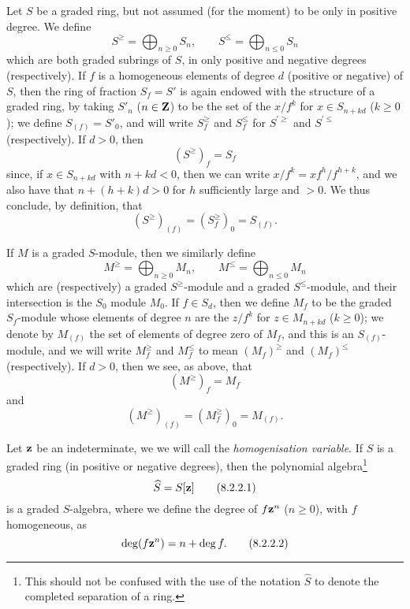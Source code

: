 \begin{env}[8.2.1]
\label{2.8.2.1}
Let $S$ be a graded ring, but not assumed (for the moment) to be only in positive degree.
We define
\[
\label{eq:2.8.2.1.1}
  S^\geq = \bigoplus_{n\geq0} S_n,
  \qquad
  S^\leq = \bigoplus_{n\leq0} S_n
\tag{8.2.1.1}
\]
which are both graded subrings of $S$, in only positive and negative degrees (respectively).
If $f$ is a homogeneous elements of degree $d$ (positive or negative) of $S$, then the ring of fraction $S_f=S'$ is again endowed with the structure of a graded ring, by taking $S'_n$ ($n\in\mathbf{Z}$) to be the set of the $x/f^k$ for $x\in S_{n+kd}$ ($k\geq0$);
we define $S_{(f)}=S'_0$, and will write $S_f^\geq$ and $S_f^\leq$ for $S^{'\geq}$ and $S^{'\leq}$ (respectively).
If $d>0$, then
\[
\label{eq:2.8.2.1.2}
  (S^\geq)_f = S_f
\tag{8.2.1.2}
\]
since, if $x\in S_{n+kd}$ with $n+kd<0$, then we can write $x/f^k = xf^h/f^{h+k}$, and we also have that $n+(h+k)d>0$ for $h$ sufficiently large and $>0$.
We thus conclude, by definition, that
\[
\label{eq:2.8.2.1.3}
  (S^\geq)_{(f)} = (S_f^\geq)_0 = S_{(f)}.
\tag{8.2.1.3}
\]

If $M$ is a graded $S$-module, then we similarly define
\[
\label{eq:2.8.2.1.4}
  M^\geq = \bigoplus_{n\geq0} M_n,
  \qquad
  M^\leq = \bigoplus_{n\leq0} M_n
\tag{8.2.1.4}
\]
which are (respectively) a graded $S^\geq$-module and a graded $S^\leq$-module, and their intersection is the $S_0$ module $M_0$.
If $f\in S_d$, then we define $M_f$ to be the graded $S_f$-module whose elements of degree $n$ are the $z/f^k$ for $z\in M_{n+kd}$ ($k\geq0$);
we denote by $M_{(f)}$ the set of elements of degree zero of $M_f$, and this is an $S_{(f)}$-module, and we will write $M_f^\geq$ and $M_f^\leq$ to mean $(M_f)^\geq$ and $(M_f)^\leq$ (respectively).
If $d>0$, then we see, as above, that
\[
\label{eq:2.8.2.1.5}
  (M^\geq)_f = M_f
\tag{8.2.1.5}
\]
and
\[
\label{eq:2.8.2.1.6}
  (M^\geq)_{(f)} = (M_f^\geq)_0 = M_{(f)}.
\tag{8.2.1.6}
\]
\end{env}

\begin{env}[8.2.2]
\label{2.8.2.2}
Let $\mathbf{z}$ be an indeterminate, we we will call the \emph{homogenisation variable}.
If $S$ is a graded ring (in positive or negative degrees), then the polynomial algebra\footnote{This should not be confused with the use of the notation $\widehat{S}$ to denote the completed separation of a ring.}
\[
\label{eq:2.8.2.2.1}
  \widehat{S} = S[\mathbf{z}]
\tag{8.2.2.1}
\]
is a graded $S$-algebra, where we define the degree of $f\mathbf{z}^n$ ($n\geq0$), with $f$ homogeneous, as
\[
\label{eq:2.8.2.2.2}
  \deg(f\mathbf{z}^n) = n+\deg f.
\tag{8.2.2.2}
\]
\end{env}

